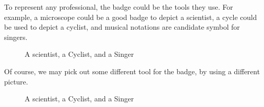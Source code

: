 \documentclass[a4paper]{article}
\begin{document}
To represent any professional, the badge could be the tools they use. For example, a microscope could be a good badge to depict a scientist, a cycle could be used to depict a cyclist, and musical notations are candidate symbol for singers. 

\begin{figure}[htb]
    \centering
    \label{fig:Tikzclip-profession}
    \caption{ A scientist, a Cyclist, and a Singer}
\end{figure}

Of course, we may pick out some different tool for the badge, by using a different picture.

\begin{figure}[htb]
    \centering
    \label{fig:Tikzclip-profession2}
    \caption{ A scientist, a Cyclist, and a Singer}
\end{figure}
\end{document}
